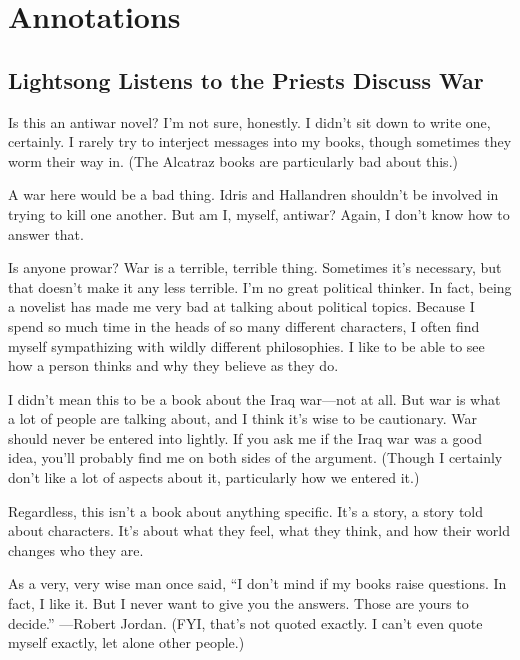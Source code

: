 \section*{Annotations}

\subsection*{Lightsong Listens to the Priests Discuss War}

Is this an antiwar novel? I’m not sure, honestly. I didn’t sit down to write one, certainly. I rarely try to interject messages into my books, though sometimes they worm their way in. (The Alcatraz books are particularly bad about this.)

A war here would be a bad thing. Idris and Hallandren shouldn’t be involved in trying to kill one another. But am I, myself, antiwar? Again, I don’t know how to answer that.

Is anyone prowar? War is a terrible, terrible thing. Sometimes it’s necessary, but that doesn’t make it any less terrible. I’m no great political thinker. In fact, being a novelist has made me very bad at talking about political topics. Because I spend so much time in the heads of so many different characters, I often find myself sympathizing with wildly different philosophies. I like to be able to see how a person thinks and why they believe as they do.

I didn’t mean this to be a book about the Iraq war—not at all. But war is what a lot of people are talking about, and I think it’s wise to be cautionary. War should never be entered into lightly. If you ask me if the Iraq war was a good idea, you’ll probably find me on both sides of the argument. (Though I certainly don’t like a lot of aspects about it, particularly how we entered it.)

Regardless, this isn’t a book about anything specific. It’s a story, a story told about characters. It’s about what they feel, what they think, and how their world changes who they are.

As a very, very wise man once said, “I don’t mind if my books raise questions. In fact, I like it. But I never want to give you the answers. Those are yours to decide.” —Robert Jordan. (FYI, that’s not quoted exactly. I can’t even quote myself exactly, let alone other people.)

